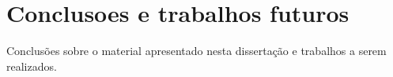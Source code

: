 \chapter{Conclusoes e trabalhos futuros} %
\label{cap:intro}

Conclusões sobre o material apresentado nesta dissertação e trabalhos a serem realizados.
